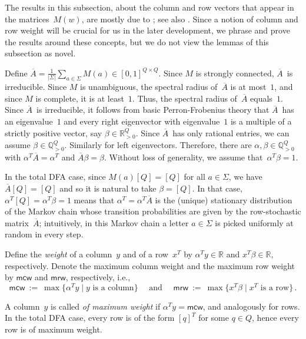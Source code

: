 \documentclass[11pt,a4paper]{amsart}
\newcommand{\RP}{\mathbb{R}_{> 0}}
\newcommand{\mcw}{\mathsf{mcw}}
\newcommand{\mrw}{\mathsf{mrw}}
\theoremstyle{plain}
\theoremstyle{definition}
\theoremstyle{defC}
\theoremstyle{thmC}
\theoremstyle{plain}
\numberwithin{equation}{section}
\begin{document}
The results in this subsection, about the column and row vectors that appear in the matrices~$M(w)$, are mostly due to \cite{Cesari74}; see also \cite[Section 3]{BealCKP08}.
Since a notion of column and row weight will be crucial for us in the later development, we phrase and prove the results around these concepts, but we do not view the lemmas of this subsection as novel.

Define $\overline{A} = \frac{1}{|\Sigma|} \sum_{a\in \Sigma} M(a) \in [0,1]^{Q \times Q}$.
Since $M$ is strongly connected, $\overline{A}$~is irreducible.
Since $M$ is unambiguous, the spectral radius of~$\overline{A}$ is at most~$1$, and since $M$ is complete, it is at least~$1$.
Thus, the spectral radius of~$\overline{A}$ equals~$1$.
Since $\overline{A}$~is irreducible, it follows from basic Perron-Frobenius theory that $\overline{A}$~has an eigenvalue~$1$ and every right eigenvector with eigenvalue~$1$ is a multiple of a strictly positive vector, say $\beta \in \RP^Q$.
Since $\overline{A}$~has only rational entries, we can assume $\beta \in \mathbb{Q}_{>0}^Q$.
Similarly for left eigenvectors.
Therefore, there are $\alpha, \beta \in \mathbb{Q}_{>0}^Q$ with $\alpha^T \overline{A} = \alpha^T$ and $\overline{A} \beta = \beta$.
Without loss of generality, we assume that~$\alpha^T \beta = 1$.

In the total DFA case, since $M(a) [Q] = [Q]$ for all $a \in \Sigma$, we have $\overline{A} [Q] = [Q]$ and so it is natural to take $\beta = [Q]$.
In that case, $\alpha^T [Q] = \alpha^T \beta = 1$ means that $\alpha^T = \alpha^T \overline{A}$ is the (unique) stationary distribution of the Markov chain whose transition probabilities are given by the row-stochastic matrix~$\overline{A}$; intuitively, in this Markov chain a letter $a \in \Sigma$ is picked uniformly at random in every step.


Define the \emph{weight} of a column~$y$ and of a row~$x^T$ by $\alpha^T y \in \mathbb{R}$ and $x^T \beta \in \mathbb{R}$, respectively.
Denote the maximum column weight and the maximum row weight by $\mcw$ and $\mrw$, respectively, i.e.,
\[
 \mcw \ := \ \max\{\alpha^T y \mid y \text{ is a column}\} \quad \text{ and } \quad
 \mrw \ := \ \max\{x^T \beta   \mid x^T \text{ is a row}\}\,.
\]

\noindent
A column~$y$ is called \emph{of maximum weight} if $\alpha^T y = \mcw$, and analogously for rows.
In the total DFA case, every row is of the form $[q]^T$ for some $q \in Q$, hence every row is of maximum weight.
\end{document}
